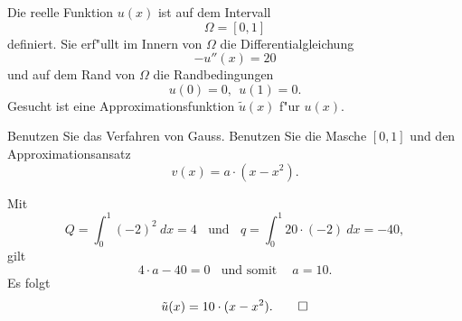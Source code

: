Die reelle Funktion $u(x)$ ist auf dem Intervall $$\Omega = [0, 1]$$
definiert. Sie erf"ullt im Innern von $\Omega$ die Differentialgleichung
\[
- u''(x) = 20
\]
und auf dem Rand von $\Omega$ die Randbedingungen 
\[
u(0) = 0, \ \ u(1) = 0.
\]
Gesucht ist eine Approximationsfunktion $\tilde u(x)$ f"ur $u(x)$.

Benutzen Sie das Verfahren von Gauss. Benutzen Sie die Masche $[0,1]$
und den Approximationsansatz
\[
v(x) = a \cdot (x - x^2).
\]

\begin{loesung}
Mit
\[
Q = \int_0^1 (-2)^2 \ dx = 4 \ \ \ \ \text{und}  \ \ \ \ q = \int_0^1 20 \cdot (-2) \  dx = -40,
\]
gilt  
\[
4 \cdot a - 40 = 0  \ \ \ \ \text{und somit }  \ \ \ \ a = 10.
\]
Es folgt 
\[
\tilde u(x) = 10 \cdot (x - x^2).
\qedhere
\]
\end{loesung}
